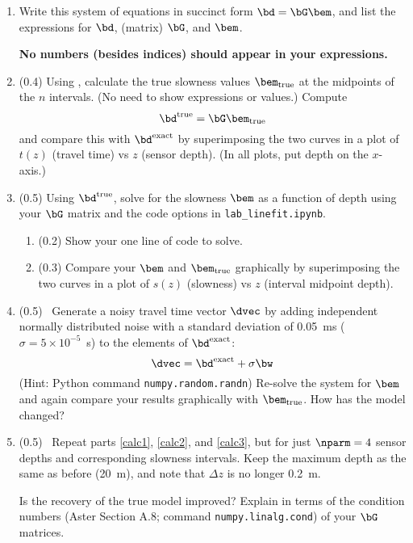 \documentclass[11pt,titlepage,fleqn]{article}
\begin{document}
\begin{enumerate}
{\bf No numbers (besides indices) should appear in your expressions.}


\item Write this system of equations in succinct form $\bd = \bG\bem$, and list the expressions for $\bd$, (matrix) $\bG$, and $\bem$.

{\bf No numbers (besides indices) should appear in your expressions.}


\item (0.4) Using , calculate the true slowness values $\bem_{\rm true}$ at the midpoints of the $n$ intervals. (No need to show expressions or values.) Compute
%
\begin{equation}
\bd^{\rm true} = \bG\bem_{\rm true}
\end{equation}
%
and compare this with $\bd^{\rm exact}$ by superimposing the two curves in a plot of $t(z)$ (travel time) vs $z$ (sensor depth). (In all plots, put depth on the $x$-axis.)

\label{calc1}


\item (0.5) Using $\bd^{\rm true}$, solve for the slowness $\bem$ as a function of depth using your $\bG$ matrix and the code options in \verb+lab_linefit.ipynb+.
%
\begin{enumerate}
\item (0.2) Show your one line of code to solve.
\item (0.3) Compare your $\bem$ and $\bem_{\rm true}$ graphically by superimposing the two curves in a plot of $s(z)$ (slowness) vs $z$ (interval midpoint depth).
\end{enumerate}

\label{calc2}


\item (0.5) \ptag\ Generate a noisy travel time vector $\dvec$ by adding independent normally distributed noise with a standard deviation of 0.05~ms ($\sigma = 5 \times 10^{-5}$~s) to the elements of $\bd^{\rm exact}$:
%
\begin{equation}
\dvec = \bd^{\rm exact} + \sigma\bw
\end{equation}
%
(Hint: Python command \verb+numpy.random.randn+) Re-solve the system for $\bem$ and again compare your results graphically with $\bem_{\rm true}$. How has the model changed?

\label{calc3}


\item (0.5) \ptag\ Repeat parts \ref{calc1}, \ref{calc2}, and \ref{calc3}, but for just $\nparm=4$ sensor depths and corresponding slowness intervals. Keep the maximum depth as the same as before (20~m), and note that $\Delta z$ is no longer 0.2~m.

Is the recovery of the true model improved? Explain in terms of the condition numbers (Aster Section A.8; command \verb+numpy.linalg.cond+) of your $\bG$ matrices.

\end{enumerate}
\end{document}
